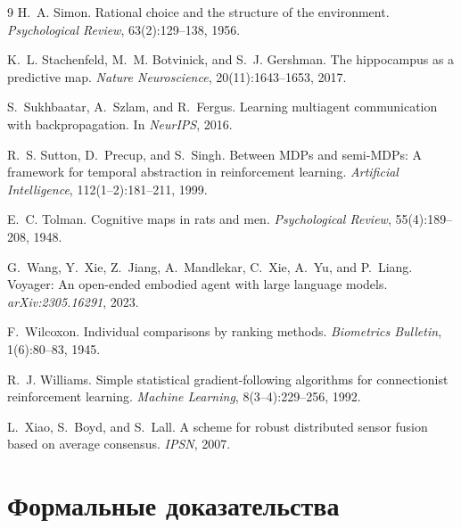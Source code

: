 \documentclass{article}
\begin{document}
{\begin{thebibliography}{9}
H.~A. Simon.
\newblock Rational choice and the structure of the environment.
\newblock \emph{Psychological Review}, 63(2):129--138, 1956.

K.~L. Stachenfeld, M.~M. Botvinick, and S.~J. Gershman.
\newblock The hippocampus as a predictive map.
\newblock \emph{Nature Neuroscience}, 20(11):1643--1653, 2017.

S.~Sukhbaatar, A.~Szlam, and R.~Fergus.
\newblock Learning multiagent communication with backpropagation.
\newblock In \emph{NeurIPS}, 2016.

R.~S. Sutton, D.~Precup, and S.~Singh.
\newblock Between MDPs and semi-MDPs: A framework for temporal abstraction in reinforcement learning.
\newblock \emph{Artificial Intelligence}, 112(1--2):181--211, 1999.

E.~C. Tolman.
\newblock Cognitive maps in rats and men.
\newblock \emph{Psychological Review}, 55(4):189--208, 1948.

G.~Wang, Y.~Xie, Z.~Jiang, A.~Mandlekar, C.~Xie, A.~Yu, and P.~Liang.
\newblock Voyager: An open-ended embodied agent with large language models.
\newblock \emph{arXiv:2305.16291}, 2023.

F.~Wilcoxon.
\newblock Individual comparisons by ranking methods.
\newblock \emph{Biometrics Bulletin}, 1(6):80--83, 1945.

R.~J. Williams.
\newblock Simple statistical gradient-following algorithms for connectionist reinforcement learning.
\newblock \emph{Machine Learning}, 8(3--4):229--256, 1992.

L.~Xiao, S.~Boyd, and S.~Lall.
\newblock A scheme for robust distributed sensor fusion based on average consensus.
\newblock \emph{IPSN}, 2007.

\end{thebibliography}
}

\appendix

\section{Формальные доказательства}
\label{app:proofs}
\end{document}
